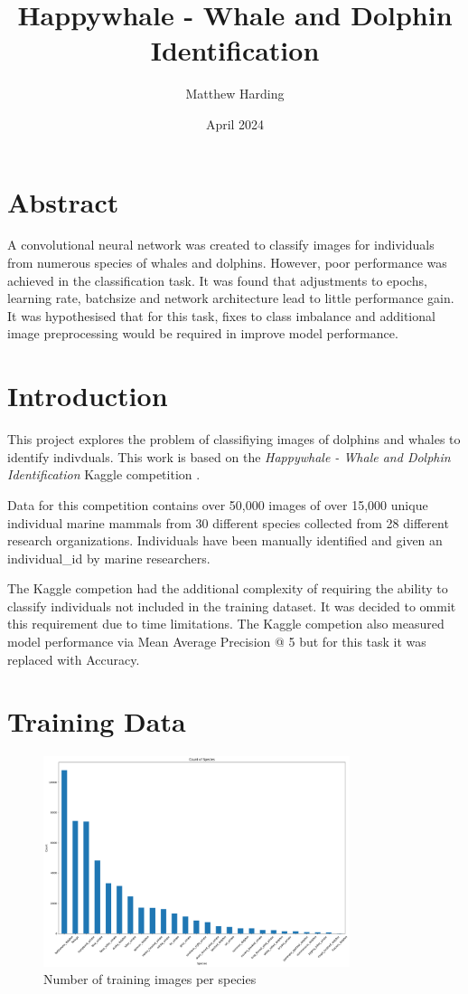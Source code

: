 \documentclass{article}
\title{Happywhale - Whale and Dolphin Identification}
\author{Matthew Harding}
\date{April 2024}
\begin{document}
\maketitle

\section{Abstract}
A convolutional neural network was created to classify images for individuals from numerous species of whales and dolphins. However, poor performance was achieved in the classification task.
It was found that adjustments to epochs, learning rate, batchsize and network architecture lead to little performance gain. It was hypothesised that for this task, fixes to class imbalance and additional image preprocessing would 
be required in improve model performance.

\section{Introduction}
This project explores the problem of classifiying images of dolphins and whales to identify indivduals. This work 
is based on the \emph{Happywhale - Whale and Dolphin Identification} Kaggle competition \cite{kaggle_comp}.

Data for this competition contains over 50,000 images of over 15,000 unique individual marine mammals from 30 different species collected from 28 different research organizations. 
Individuals have been manually identified and given an individual\_id by marine researchers.

The Kaggle competion had the additional complexity of requiring the ability to classify individuals not included in the training dataset. It was decided to ommit this requirement due to time limitations. The Kaggle competion also measured model performance via Mean Average Precision @ 5 but for this task it was replaced with Accuracy.

\section{Training Data}

\begin{figure}[!htb]
    \centering
    \includegraphics[width=0.8\textwidth]{species_histogram.png}
    \caption{Number of training images per species}
    \label{fig:species_count_histogram}
\end{figure}
\end{document}
